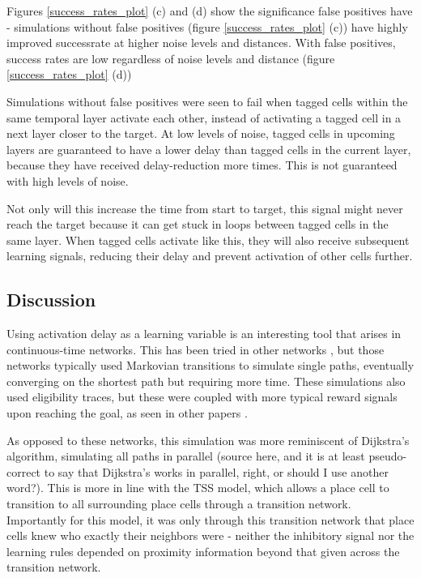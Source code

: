 \documentclass{article}
\begin{document}
    Figures \ref{success_rates_plot} (c) and (d) show the significance false positives have - simulations without false positives (figure \ref{success_rates_plot} (c)) have highly improved successrate at higher noise levels and distances. With false positives, success rates are low regardless of noise levels and distance (figure \ref{success_rates_plot} (d))

    Simulations without false positives were seen to fail when tagged cells within the same temporal layer activate each other, instead of activating a tagged cell in a next layer closer to the target. At low levels of noise, tagged cells in upcoming layers are guaranteed to have a lower delay than tagged cells in the current  layer, because they have received delay-reduction more times. This is not guaranteed with high levels of noise.

    Not only will this increase the time from start to target, this signal might never reach the target because it can get stuck in loops between tagged cells in the same layer. When tagged cells activate like this, they will also receive subsequent learning signals, reducing their delay and prevent activation of other cells further.

    \subsection{Discussion}
    Using activation delay as a learning variable is an interesting tool that arises in continuous-time networks. This has been tried in other networks \parencite{Krichmar2022, Niedermeier2023}, but those networks typically used Markovian transitions to simulate single paths, eventually converging on the shortest path but requiring more time. These simulations also used eligibility traces, but these were coupled with more typical reward signals upon reaching the goal, as seen in other papers \parencite{Bellec2020}.

    As opposed to these networks, this simulation was more reminiscent of Dijkstra's algorithm, simulating all paths in parallel (source here, and it is at least pseudo-correct to say that Dijkstra's works in parallel, right, or should I use another word?). This is more in line with the TSS model, which allows a place cell to transition to all surrounding place cells through a transition network. Importantly for this model, it was only through this transition network that place cells knew who exactly their neighbors were - neither the inhibitory signal nor the learning rules depended on proximity information beyond that given across the transition network.
\end{document}
